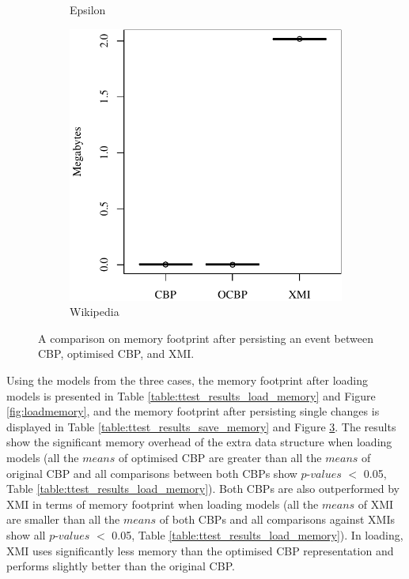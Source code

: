 {\begin{figure}[ht]
\begin{subfigure}{0.325\textwidth}
    \caption{Epsilon}
    \label{fig:save_memory_epsilon}
  \end{subfigure}
  \hfill
  \begin{subfigure}{0.325\textwidth}
    \centering
    \includegraphics[width=\linewidth]{images/ol_save_memory_wikipedia}
    \caption{Wikipedia}
    \label{fig:save_memory_wikipedia}
  \end{subfigure}
  \caption{A comparison on memory footprint after persisting an event between CBP, optimised CBP, and XMI.}
  \label{fig:savememory}
\end{figure}

Using the models from the three cases, the memory footprint after loading models is presented in Table \ref{table:ttest_results_load_memory} and Figure \ref{fig:loadmemory}, and the memory footprint after persisting single changes is displayed in Table \ref{table:ttest_results_save_memory} and Figure \ref{fig:savememory}. The results show the significant memory overhead of the extra data structure when loading models (all the $means$ of optimised CBP are greater than all the $means$ of original CBP and all comparisons between both CBPs show $p$-$values$ $<$ 0.05, Table \ref{table:ttest_results_load_memory}). Both CBPs are also outperformed by XMI in terms of memory footprint when loading models (all the $means$ of XMI are smaller than all the $means$ of both CBPs and all comparisons against XMIs show all $p$-$values$ $<$ 0.05, Table \ref{table:ttest_results_load_memory}). In loading, XMI uses significantly less memory than the optimised CBP representation and performs slightly better than the original CBP.   

}
